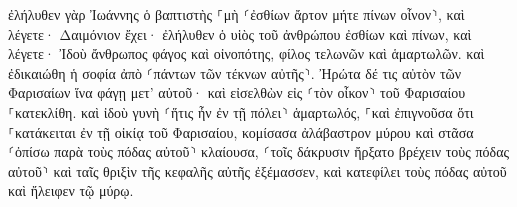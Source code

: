 \documentclass{openreader}
\begin{document}
ἐλήλυθεν γὰρ Ἰωάννης ὁ βαπτιστὴς ⸀μὴ ⸂ἐσθίων ἄρτον μήτε πίνων οἶνον⸃, καὶ λέγετε· Δαιμόνιον ἔχει· 
ἐλήλυθεν ὁ υἱὸς τοῦ ἀνθρώπου ἐσθίων καὶ πίνων, καὶ λέγετε· Ἰδοὺ ἄνθρωπος φάγος καὶ οἰνοπότης, φίλος τελωνῶν καὶ ἁμαρτωλῶν. 
καὶ ἐδικαιώθη ἡ σοφία ἀπὸ ⸂πάντων τῶν τέκνων αὐτῆς⸃. 
Ἠρώτα δέ τις αὐτὸν τῶν Φαρισαίων ἵνα φάγῃ μετ’ αὐτοῦ· καὶ εἰσελθὼν εἰς ⸂τὸν οἶκον⸃ τοῦ Φαρισαίου ⸀κατεκλίθη. 
καὶ ἰδοὺ γυνὴ ⸂ἥτις ἦν ἐν τῇ πόλει⸃ ἁμαρτωλός, ⸀καὶ ἐπιγνοῦσα ὅτι ⸀κατάκειται ἐν τῇ οἰκίᾳ τοῦ Φαρισαίου, κομίσασα ἀλάβαστρον μύρου 
καὶ στᾶσα ⸂ὀπίσω παρὰ τοὺς πόδας αὐτοῦ⸃ κλαίουσα, ⸂τοῖς δάκρυσιν ἤρξατο βρέχειν τοὺς πόδας αὐτοῦ⸃ καὶ ταῖς θριξὶν τῆς κεφαλῆς αὐτῆς ἐξέμασσεν, καὶ κατεφίλει τοὺς πόδας αὐτοῦ καὶ ἤλειφεν τῷ μύρῳ. 
\end{document}
